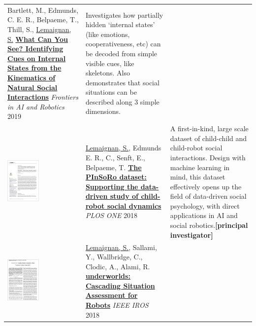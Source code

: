 \documentclass[11pt,a4paper]{report}
\begin{document}
\begin{tabular}{p{1.7cm}p{7cm}p{8cm}}
    Bartlett, M., Edmunds, C. E. R., Belpaeme, T., Thill, S., \ul{Lemaignan, S.} 
    \href{https://doi.org/10.3389/frobt.2019.00049}{\textbf{What Can You See? Identifying Cues on Internal States from the
    Kinematics of Natural Social Interactions}} 
    \newline \textit{Frontiers in AI and Robotics} 2019
    & \small Investigates how partially hidden `internal states' (like emotions,
    cooperativeness, etc) can be decoded from simple visible cues, like
    skeletons. Also demonstrates that social situations can be described along 3
    simple dimensions.\textbf{}\\


    \vspace{-.20cm}\includegraphics[height=2.2cm]{thumbs/2018-plosone.jpg} &

    \ul{Lemaignan, S.}, Edmunds E. R., C., Senft, E., Belpaeme, T.
    \newline\href{https://doi.org/10.1371/journal.pone.0205999}{\textbf{The
    PInSoRo dataset: Supporting the data-driven study of child-robot social
    dynamics}}
    \newline \textit{PLOS ONE} 2018
    & \small A first-in-kind, large scale dataset of child-child and child-robot social interactions. Design
    with machine learning in mind, this dataset effectively opens up the field
    of data-driven social psychology, with direct applications in AI and social
    robotics.\textbf{[principal investigator]}\\

    \vspace{-.20cm}\includegraphics[height=2.2cm]{thumbs/2018-underworlds.jpg} &

    \ul{Lemaignan, S.}, Sallami, Y., Wallbridge, C., Clodic, A., Alami,
    R. 
   \newline\href{https://doi.org/10.1109/IROS.2018.8594094}{\textbf{\sc
    underworlds: Cascading Situation Assessment for Robots}}
    \newline\textit{IEEE IROS} 2018


\end{tabular}
\end{document}
